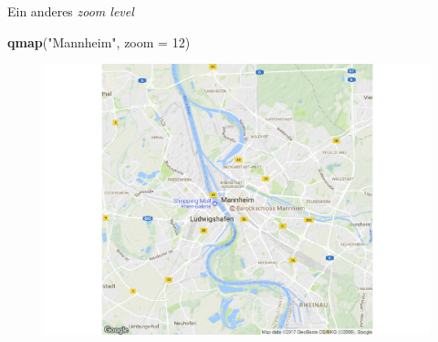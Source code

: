 \documentclass[ignorenonframetext,]{beamer}
\newenvironment{Shaded}{}{}
\newcommand{\KeywordTok}[1]{\textcolor[rgb]{0.00,0.44,0.13}{\textbf{{#1}}}}
\newcommand{\DataTypeTok}[1]{\textcolor[rgb]{0.56,0.13,0.00}{{#1}}}
\newcommand{\DecValTok}[1]{\textcolor[rgb]{0.25,0.63,0.44}{{#1}}}
\newcommand{\StringTok}[1]{\textcolor[rgb]{0.25,0.44,0.63}{{#1}}}
\newcommand{\NormalTok}[1]{{#1}}
\begin{document}
\begin{frame}[fragile]{Ein anderes \emph{zoom level}}

\begin{Shaded}
\begin{Highlighting}[]
\KeywordTok{qmap}\NormalTok{(}\StringTok{"Mannheim"}\NormalTok{, }\DataTypeTok{zoom =} \DecValTok{12}\NormalTok{)}
\end{Highlighting}
\end{Shaded}

\begin{figure}[htbp]
\centering
\includegraphics{RSocialScience2_files/figure-beamer/unnamed-chunk-34-1.pdf}
\caption{}
\end{figure}

\end{frame}
\end{document}
